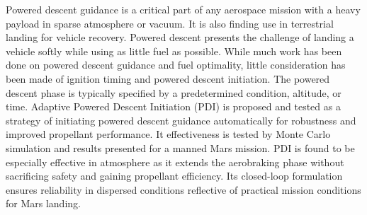 


%

Powered descent guidance is a critical part of any aerospace mission with a heavy payload in sparse atmosphere or vacuum. It is also finding use in terrestrial landing for vehicle recovery. Powered descent presents the challenge of landing a vehicle softly while using as little fuel as possible. While much work has been done on powered descent guidance and fuel optimality, little consideration has been made of ignition timing and powered descent initiation. The powered descent phase is typically specified by a predetermined condition, altitude, or time. Adaptive Powered Descent Initiation (PDI) is proposed and tested as a strategy of initiating powered descent guidance automatically for robustness and improved propellant performance. It effectiveness is tested by Monte Carlo simulation and results presented for a manned Mars mission. PDI is found to be especially effective in atmosphere as it extends the aerobraking phase without sacrificing safety and gaining propellant efficiency. Its closed-loop formulation ensures reliability in dispersed conditions reflective of practical mission conditions for Mars landing.
